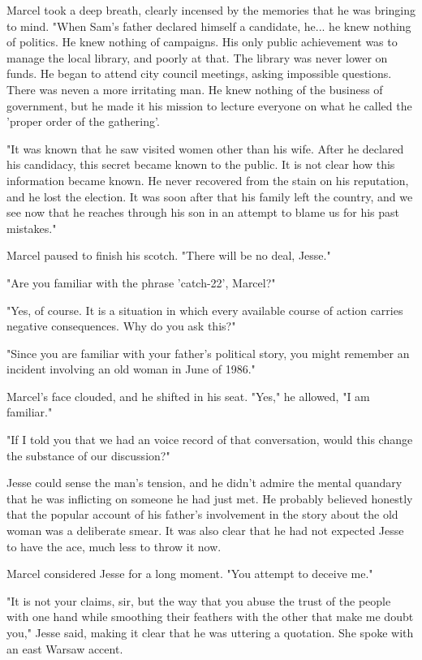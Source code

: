 Marcel took a deep breath, clearly incensed by the memories that he was bringing to mind.  "When Sam's father declared himself a candidate, he... he knew nothing of politics.  He knew nothing of campaigns.  His only public achievement was to manage the local library, and poorly at that.  The library was never lower on funds.  He began to attend city council meetings, asking impossible questions.  There was neven a more irritating man.  He knew nothing of the business of government, but he made it his mission to lecture everyone on what he called the 'proper order of the gathering'.

"It was known that he saw visited women other than his wife.  After he declared his candidacy, this secret became known to the public.  It is not clear how this information became known.  He never recovered from the stain on his reputation, and he lost the election.  It was soon after that his family left the country, and we see now that he reaches through his son in an attempt to blame us for his past mistakes."

Marcel paused to finish his scotch.  "There will be no deal, Jesse."

"Are you familiar with the phrase 'catch-22', Marcel?"

"Yes, of course.  It is a situation in which every available course of action carries negative consequences.  Why do you ask this?"

"Since you are familiar with your father's political story, you might remember an incident involving an old woman in June of 1986."

Marcel's face clouded, and he shifted in his seat.  "Yes," he allowed, "I am familiar."

"If I told you that we had an voice record of that conversation, would this change the substance of our discussion?"

Jesse could sense the man's tension, and he didn't admire the mental quandary that he was inflicting on someone he had just met.  He probably believed honestly that the popular account of his father's involvement in the story about the old woman was a deliberate smear.  It was also clear that he had not expected Jesse to have the ace, much less to throw it now.

Marcel considered Jesse for a long moment.  "You attempt to deceive me."

"It is not your claims, sir, but the way that you abuse the trust of the people with one hand while smoothing their feathers with the other that make me doubt you," Jesse said, making it clear that he was uttering a quotation.  She spoke with an east Warsaw accent.

